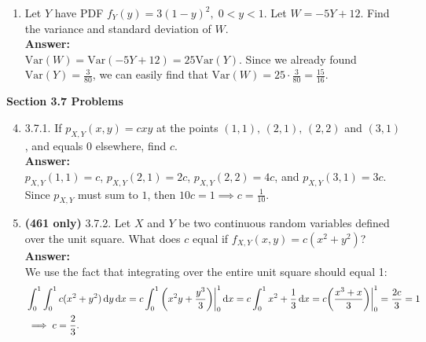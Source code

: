 \documentclass{article}
\begin{document}
\begin{enumerate}
        \item Let $Y$ have PDF $f_Y(y) = 3(1-y)^2, \; 0 < y < 1$. Let $W = -5Y+12$. Find the variance and standard deviation of $W$.\\
        \textbf{Answer: }\\
        $\mathrm{Var}(W) = \mathrm{Var}(-5Y+12) = 25\mathrm{Var}(Y)$. Since we already found $\mathrm{Var}(Y) = \frac{3}{80}$, we can easily find that $\mathrm{Var}(W) = 25 \cdot \frac{3}{80} = \frac{15}{16}$.\\
    \end{enumerate}
    \textbf{Section 3.7 Problems}
    \begin{enumerate} \setcounter{enumi}{3}
        \item 3.7.1. If $p_{X,Y}(x,y) = cxy$ at the points $(1,1),\,(2,1),\,(2,2)$ and $(3,1)$, and equals $0$ elsewhere, find $c$.\\
        \textbf{Answer: }\\
        $p_{X,Y}(1,1) = c$, $p_{X,Y}(2,1) = 2c$, $p_{X,Y}(2,2) = 4c$, and $p_{X,Y}(3,1) = 3c$. Since $p_{X,Y}$ must sum to $1$, then $10c = 1 \implies c = \frac{1}{10}$.\\
        
        \item \textbf{(461 only)} 3.7.2. Let $X$ and $Y$ be two continuous random variables defined over the unit square. What does $c$ equal if $f_{X,Y}(x,y) = c(x^2+y^2)$?\\
        \textbf{Answer: }\\
        We use the fact that integrating over the entire unit square should equal 1:
        \begin{align*}
            &\int_0^1\int_0^1 c(x^2+y^2) \dif y \dif x = c \int_0^1 \bigg(x^2y+\frac{y^3}{3}\bigg)\bigg|_0^1 \dif x = c\int_0^1 x^2+\frac{1}{3} \dif x = c\bigg(\frac{x^3+x}{3}\bigg)\bigg|_0^1 = \frac{2c}{3} = 1\\
            &\implies c = \frac{2}{3}.
        \end{align*}
        

\end{enumerate}
\end{document}
